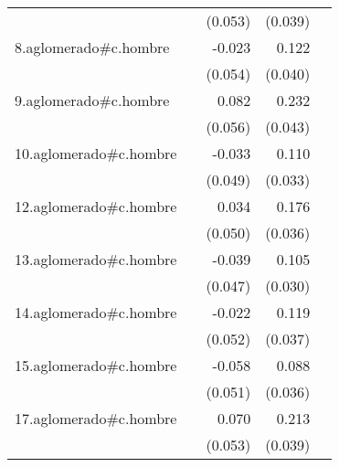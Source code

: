 {\begin{longtable}{l*{4}{D{.}{.}{-1}}}
            &                     &     (0.053)         &     (0.039)         &                     \\
\addlinespace
8.aglomerado#c.hombre&                     &      -0.023         &       0.122\sym{**} &                     \\
            &                     &     (0.054)         &     (0.040)         &                     \\
\addlinespace
9.aglomerado#c.hombre&                     &       0.082         &       0.232\sym{***}&                     \\
            &                     &     (0.056)         &     (0.043)         &                     \\
\addlinespace
10.aglomerado#c.hombre&                     &      -0.033         &       0.110\sym{***}&                     \\
            &                     &     (0.049)         &     (0.033)         &                     \\
\addlinespace
12.aglomerado#c.hombre&                     &       0.034         &       0.176\sym{***}&                     \\
            &                     &     (0.050)         &     (0.036)         &                     \\
\addlinespace
13.aglomerado#c.hombre&                     &      -0.039         &       0.105\sym{***}&                     \\
            &                     &     (0.047)         &     (0.030)         &                     \\
\addlinespace
14.aglomerado#c.hombre&                     &      -0.022         &       0.119\sym{**} &                     \\
            &                     &     (0.052)         &     (0.037)         &                     \\
\addlinespace
15.aglomerado#c.hombre&                     &      -0.058         &       0.088\sym{*}  &                     \\
            &                     &     (0.051)         &     (0.036)         &                     \\
\addlinespace
17.aglomerado#c.hombre&                     &       0.070         &       0.213\sym{***}&                     \\
            &                     &     (0.053)         &     (0.039)         &                     \\

\end{longtable}}
